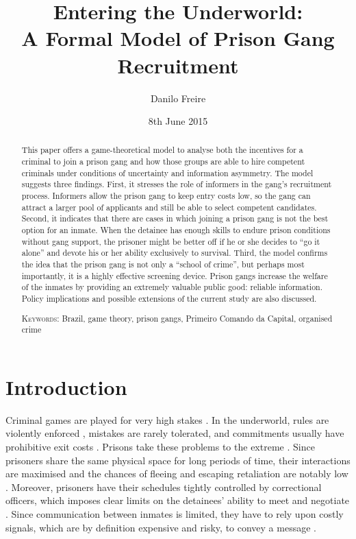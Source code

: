 \documentclass[a4paper,12pt]{article}
\title{Entering the Underworld:\\ A Formal Model of Prison Gang Recruitment}
\author{Danilo Freire}
\date{8th June 2015}
\begin{document}
\maketitle

\begin{abstract}
\doublespacing

This paper offers a game-theoretical model to analyse both the incentives for a criminal to join a prison gang and how those groups are able to hire competent criminals under conditions of uncertainty and information asymmetry. The model suggests three findings. First, it stresses the role of informers in the gang's recruitment process. Informers allow the prison gang to keep entry costs low, so the gang can attract a larger pool of applicants and still be able to select competent candidates. Second, it indicates that there are cases in which joining a prison gang is not the best option for an inmate. When the detainee has enough skills to endure prison conditions without gang support, the prisoner might be better off if he or she decides to ``go it alone'' and devote his or her ability exclusively to survival. Third, the model confirms the idea that the prison gang is not only a ``school of crime'', but perhaps most importantly, it is a highly effective screening device. Prison gangs increase the welfare of the inmates by providing an extremely valuable public good: reliable information. Policy implications and possible extensions of the current study are also discussed.

\vspace{.5cm}
\noindent
\textsc{Keywords:} Brazil, game theory, prison gangs, Primeiro Comando da Capital, organised crime
\end{abstract}

\newpage

\section{Introduction}
\doublespacing

Criminal games are played for very high stakes \citep[p. 2]{dixit2011game}. In the underworld, rules are violently enforced \citep{liebling2012social, von2004organized}, mistakes are rarely tolerated, and commitments usually have prohibitive exit costs \citep{campana2013cooperation}. Prisons take these problems to the extreme \citep{clemmer1940prison, sykes1958society}. Since prisoners share the same physical space for long periods of time, their interactions are maximised and the chances of fleeing and escaping retaliation are notably low \citep{skarbek2011governance}. Moreover, prisoners have their schedules tightly controlled by correctional officers, which imposes clear limits on the detainees' ability to meet and negotiate \citep[p. 7]{skarbek2014social}. Since communication between inmates is limited, they have to rely upon costly signals, which are by definition expensive and risky, to convey a message \citep{gambetta2009codes}.
\end{document}
